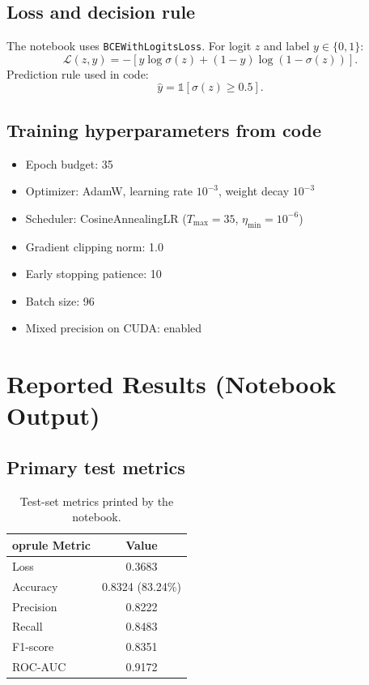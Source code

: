 \documentclass[conference]{IEEEtran}
\begin{document}
\subsection{Loss and decision rule}
The notebook uses \texttt{BCEWithLogitsLoss}. For logit $z$ and label $y\in\{0,1\}$:
\begin{equation}
\mathcal{L}(z,y) = -\left[y\log\sigma(z) + (1-y)\log(1-\sigma(z))\right].
\end{equation}
Prediction rule used in code:
\begin{equation}
\hat{y}=\mathbb{1}[\sigma(z)\ge 0.5].
\end{equation}

\subsection{Training hyperparameters from code}
\begin{itemize}
    \item Epoch budget: 35
    \item Optimizer: AdamW, learning rate $10^{-3}$, weight decay $10^{-3}$
    \item Scheduler: CosineAnnealingLR ($T_{\max}=35$, $\eta_{\min}=10^{-6}$)
    \item Gradient clipping norm: 1.0
    \item Early stopping patience: 10
    \item Batch size: 96
    \item Mixed precision on CUDA: enabled
\end{itemize}

\section{Reported Results (Notebook Output)}
\subsection{Primary test metrics}
\begin{table}[!t]
\caption{Test-set metrics printed by the notebook.}
\label{tab:primary}
\centering
\begin{tabular}{lc}
	oprule
Metric & Value \\
\midrule
Loss & 0.3683 \\
Accuracy & 0.8324 (83.24\%) \\
Precision & 0.8222 \\
Recall & 0.8483 \\
F1-score & 0.8351 \\
ROC-AUC & 0.9172 \\
\bottomrule
\end{tabular}
\end{table}
\end{document}
